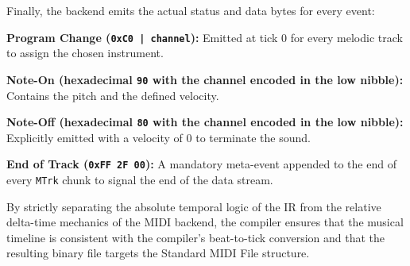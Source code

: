 Finally, the backend emits the actual status and data bytes for every event:

\noindent \textbf{Program Change (\texttt{0xC0 | channel}):} Emitted at tick 0 for every melodic track to assign the
chosen instrument.

\noindent \textbf{Note-On (hexadecimal \texttt{90} with the channel encoded in the low nibble):} Contains the pitch and
the defined velocity.

\noindent \textbf{Note-Off (hexadecimal \texttt{80} with the channel encoded in the low nibble):} Explicitly
emitted with
a velocity of 0 to terminate the sound.

\noindent \textbf{End of Track (\texttt{0xFF 2F 00}):} A mandatory meta-event appended to the end of every \texttt{MTrk}
chunk to signal the end of the data stream.

By strictly separating the absolute temporal logic of the IR from the relative delta-time mechanics of the MIDI backend,
the compiler ensures that the musical timeline is consistent with the compiler's beat-to-tick conversion and
that the resulting binary file targets the Standard MIDI File structure.
